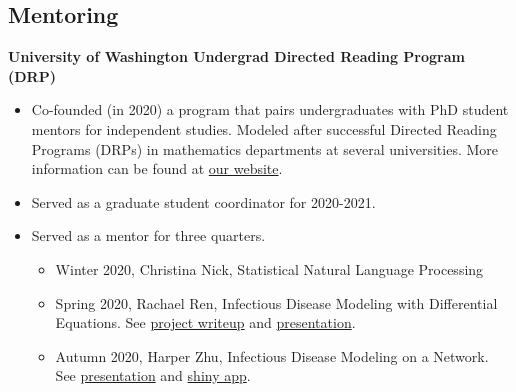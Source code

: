 \documentclass[margin, 10pt]{res} %
\begin{document}
\begin{resume}
{\section{Mentoring}
{\textbf{University of Washington Undergrad Directed Reading Program (DRP)}}
\begin{itemize}
  \item Co-founded (in 2020) a program that pairs undergraduates with PhD student mentors for independent studies. Modeled after successful Directed Reading Programs (DRPs) in mathematics departments at several universities. More information can be found at \href{spa-drp.github.io}{our website}. 
  \item Served as a graduate student coordinator for 2020-2021. 
  \item Served as a mentor for three quarters.
  \begin{itemize}
  \item Winter 2020, Christina Nick, Statistical Natural Language Processing
  \item Spring 2020, Rachael Ren, Infectious Disease Modeling with Differential Equations. See \href{https://spa-drp.github.io/writeups/spring2020/rachael.pdf}{project writeup} and \href{https://spa-drp.github.io/writeups/spring2020/rachaelslides.pdf}{presentation}.
  \item Autumn 2020, Harper Zhu, Infectious Disease Modeling on a Network.  See \href{https://spa-drp.github.io/writeups/aut2020/harper-slides.pdf}{presentation} and \href{https://harperzhu.shinyapps.io/DiseaseSimulation/}{shiny app}.
 \end{itemize}
 \end{itemize}



}
\end{resume}
\end{document}
